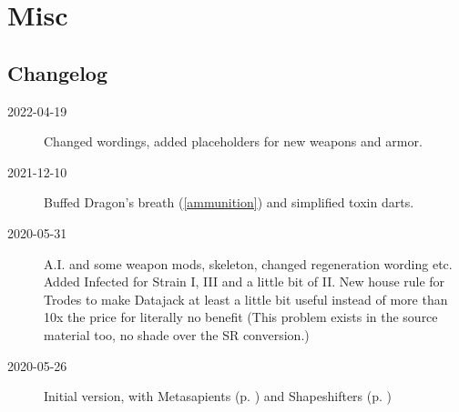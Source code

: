 \documentclass{book}
\begin{document}
\printindex

\appendix
\chapter{Misc}
\section{Changelog}
\begin{description}
	\item[2022-04-19] Changed wordings, added placeholders for new weapons and armor. 
	\item[2021-12-10] Buffed Dragon's breath (\ref{ammunition}) and simplified toxin darts.
	\item[2020-05-31] A.I. and some weapon mods, skeleton, changed regeneration wording etc. Added Infected \pageref{sec:gettinginfected} for Strain I, III and a little bit of II. New house rule for Trodes to make Datajack at least a little bit useful instead of more than 10x the price for literally no benefit (This problem exists in the source material too, no shade over the SR conversion.)
	\item[2020-05-26] Initial version, with Metasapients (p. \pageref{sec:metasapients}) and Shapeshifters (p. \pageref{sec:shapeshifters}) 
\end{description}
\end{document}

